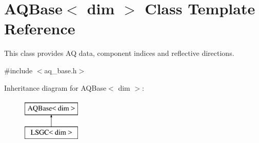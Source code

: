 \hypertarget{class_a_q_base}{}\section{A\+Q\+Base$<$ dim $>$ Class Template Reference}
\label{class_a_q_base}


This class provides AQ data, component indices and reflective directions.  




{\ttfamily \#include $<$aq\+\_\+base.\+h$>$}

Inheritance diagram for A\+Q\+Base$<$ dim $>$\+:\begin{figure}[H]
\begin{center}
\leavevmode
\includegraphics[height=2.000000cm]{class_a_q_base}
\end{center}
\end{figure}
